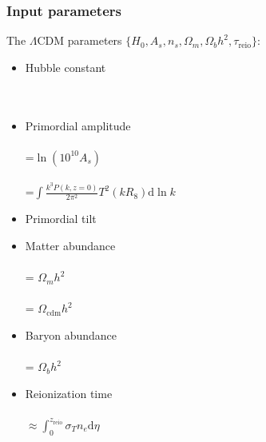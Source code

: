 \begin{frame}[fragile]
	\frametitle{Input parameters}
	The $\Lambda$CDM parameters $\{H_0, A_s, n_s, \Omega_m, \Omega_b h^2, \tau_\mathrm{reio}\}$:
	\begin{itemize}
		\item Hubble constant\\
		\\
		\\
		\pause
		\item Primordial amplitude\\
		\\
		 \qquad =$\ln(10^{10} A_s)$\\
		 \\
		 \qquad =$\int \frac{k^3 P(k,z=0)}{2\pi^2} T^2(k R_8) \mathrm{d} \ln k$\pause
		\item Primordial tilt\\
		\pause
		\item Matter abundance\\
		\\
		 \qquad = $\Omega_m h^2$\\
		\\
		 \qquad = $\Omega_\mathrm{cdm} h^2$\\
		\pause
		\item Baryon abundance\\
		\\
		 \qquad = $\Omega_b h^2$\\
		\item Reionization time\\
		 \\
		\qquad  $\approx \int_0^{z_\mathrm{reio}} \sigma_T n_e \mathrm{d}\eta$\\
	\end{itemize}
\end{frame}


